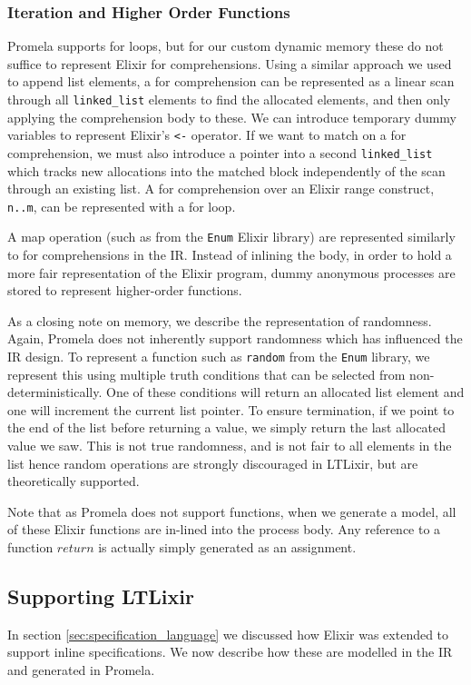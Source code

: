\subsubsection{Iteration and Higher Order Functions}
Promela supports for loops, but for our custom dynamic memory these do not suffice to represent Elixir for comprehensions. Using a similar approach we used to append list elements, a for comprehension can be represented as a linear scan through all \texttt{linked\_list} elements to find the allocated elements, and then only applying the comprehension body to these. We can introduce temporary dummy variables to represent Elixir's \texttt{<-} operator. If we want to match on a for comprehension, we must also introduce a pointer into a second \texttt{linked\_list} which tracks new allocations into the matched block independently of the scan through an existing list. A for comprehension over an Elixir range construct, \texttt{n..m}, can be represented with a for loop.
\par
A map operation (such as from the \texttt{Enum} Elixir library) are represented similarly to for comprehensions in the IR. Instead of inlining the body, in order to hold a more fair representation of the Elixir program, dummy anonymous processes are stored to represent higher-order functions.
\par
As a closing note on memory, we describe the representation of randomness. Again, Promela does not inherently support randomness which has influenced the IR design. To represent a function such as \texttt{random} from the \texttt{Enum} library, we represent this using multiple truth conditions that can be selected from non-deterministically. One of these conditions will return an allocated list element and one will increment the current list pointer. To ensure termination, if we point to the end of the list before returning a value, we simply return the last allocated value we saw. This is not true randomness, and is not fair to all elements in the list hence random operations are strongly discouraged in LTLixir, but are theoretically supported.
\par
Note that as Promela does not support functions, when we generate a model, all of these Elixir functions are in-lined into the process body. Any reference to a function $return$ is actually simply generated as an assignment.

\subsection{Supporting LTLixir} \label{sec:supporting_ltl}
In section \ref{sec:specification_language} we discussed how Elixir was extended to support inline specifications. We now describe how these are modelled in the IR and generated in Promela.
\par
